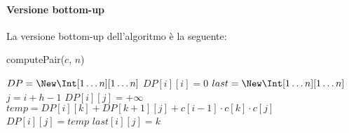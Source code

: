             \paragraph{Versione bottom-up} La versione bottom-up dell'algoritmo è la seguente:
            \begin{algorithm}
                \caption{computePair(\Int[] $c$, \Int $n$)}
                \begin{algorithmic}
                    \State \Int[][] $DP = \New \Int[1\dots n][1\dots n]$
                        \State $DP[i][i]=0$
                    \EndFor
                    \State \Int[][] $last = \New \Int[1\dots n][1\dots n]$
                            \State \Int $j=i+h-1$
                            \State $DP[i][j]=+\infty$
                                \State $temp = DP[i][k]+DP[k+1][j]+c[i-1]\cdot c[k]\cdot c[j]$
                                    \State $DP[i][j]=temp$
                                    \State $last[i][j]=k$
                                \EndIf
                            \EndFor
                        \EndFor
                    \EndFor
                \end{algorithmic}
            \end{algorithm}